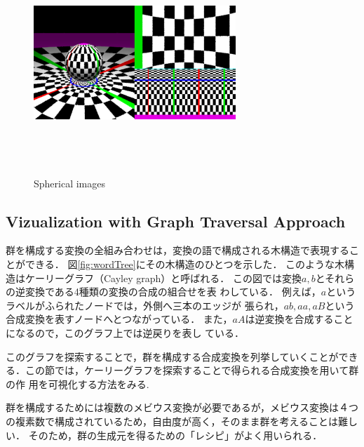 \begin{figure}[htbp]
\begin{minipage}{0.5\hsize}
  \label{fig:sphericalTranslation}
 \end{minipage}
 \begin{minipage}{0.5\hsize}
  \center
  \includegraphics[width=3in, height=3in, keepaspectratio]{../img/klein/sphericalScaling.pdf}
  \label{fig:sphericalScaling}
 \end{minipage}
 \caption{Spherical images}
 \label{fig:spherical}
\end{figure}

\subsection{Vizualization with Graph Traversal Approach}

群を構成する変換の全組み合わせは，変換の語で構成される木構造で表現するこ
とができる．
図\ref{fig:wordTree}にその木構造のひとつを示した．
このような木構造はケーリーグラフ（Cayley graph）と呼ばれる．
この図では変換$a, b$とそれらの逆変換である4種類の変換の合成の組合せを表
わしている．
例えば，$a$というラベルがふられたノードでは，外側へ三本のエッジが
張られ，$ab, aa, aB$という合成変換を表すノードへとつながっている．
また，$aA$は逆変換を合成することになるので，このグラフ上では逆戻りを表し
ている．

このグラフを探索することで，群を構成する合成変換を列挙していくことができ
る．この節では，ケーリーグラフを探索することで得られる合成変換を用いて群の作
用を可視化する方法をみる.

群を構成するためには複数のメビウス変換が必要であるが，メビウス変換は４つ
の複素数で構成されているため，自由度が高く，そのまま群を考えることは難し
い．
そのため，群の生成元を得るための「レシピ」がよく用いられる．

